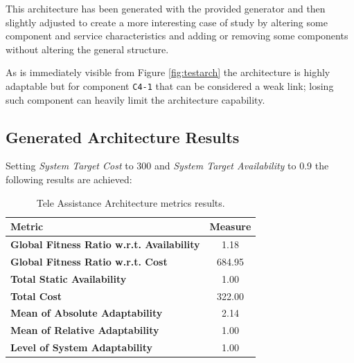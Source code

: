 This architecture has been generated with the provided generator and then slightly adjusted to create a more interesting case of study by altering some component and service characteristics and adding or removing some components without altering the general structure.

As is immediately visible from Figure \ref{fig:testarch} the architecture is highly adaptable but for component \texttt{C4-1} that can be considered a weak link; losing such component can heavily limit the architecture capability. 

\subsection{Generated Architecture Results}

Setting \emph{System Target Cost} to 300 and \emph{System Target Availability} to 0.9 the following results are achieved:

\begin{table}[ht!b]
\centering
	\begin{tabular}{|l|c|}
		\hline
		Metric & Measure \\
		\hline 
		\textbf{Global Fitness Ratio w.r.t. Availability} & 1.18 \\ 
		\hline 
		\textbf{Global Fitness Ratio w.r.t. Cost} & 684.95 \\
		\hline 
		\textbf{Total Static Availability} & 1.00 \\
		\hline 
		\textbf{Total Cost} & 322.00 \\
		\hline 
		\textbf{Mean of Absolute Adaptability} & 2.14 \\
		\hline
		\textbf{Mean of Relative Adaptability} & 1.00 \\
		\hline
		\textbf{Level of System Adaptability} & 1.00 \\
		\hline
	\end{tabular} 
	\caption[TAS Service Architecture Metrics]{Tele Assistance Architecture metrics results.}
	\label{tab:ag-arch-res}
\end{table}

